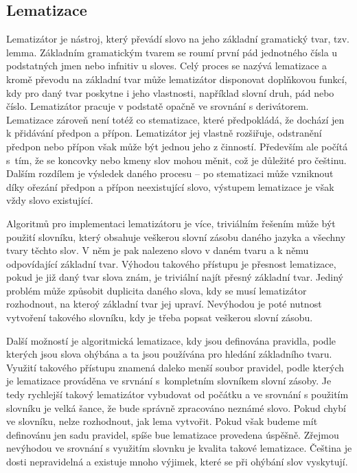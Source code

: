 \documentclass[FM,DP]{tulthesis}
\begin{document}
\subsection{Lematizace}

Lematizátor je nástroj, který převádí slovo na jeho základní gramatický tvar, tzv. lemma.
Základním gramatickým tvarem se roumí první pád jednotného čísla u podstatných jmen nebo infnitiv 
u sloves. Celý proces se nazývá lematizace a kromě převodu na základní tvar může lematizátor
disponovat doplňkovou funkcí, kdy pro daný tvar poskytne i jeho vlastnosti, například 
slovní druh, pád nebo číslo. Lematizátor pracuje v podstatě opačně ve srovnání s derivátorem. 
Lematizace zároveň není totéž co stematizace, které předpokládá, že dochází 
jen k přidávání předpon a přípon. Lematizátor jej vlastně rozšiřuje, odstranění
předpon nebo přípon však může být jednou jeho z činností. Především ale počítá s~tím, 
že se koncovky nebo kmeny slov mohou měnit, což je důležité pro češtinu.
Dalším rozdílem je výsledek daného procesu -- po stematizaci může vzniknout díky ořezání
předpon a přípon neexistující slovo, výstupem lematizace je však vždy slovo existující.

Algoritmů pro implementaci lematizátoru je více, triviálním řešením může být použití
slovníku, který obsahuje veškerou slovní zásobu daného jazyka a všechny tvary těchto
slov. V něm je pak nalezeno slovo v daném tvaru a k němu odpovídající základní tvar.
Výhodou takového přístupu je přesnost lematizace, pokud je již daný tvar slova znám, 
je triviální najít přesný základní tvar. Jediný problém může způsobit duplicita daného 
slova, kdy se musí lematizátor rozhodnout, na kteroý základní tvar jej upraví. Nevýhodou
je poté nutnost vytvoření takového slovníku, kdy je třeba popsat veškerou slovní zásobu.

Další možností je algoritmická lematizace, kdy jsou definována pravidla, podle kterých jsou
slova ohýbána a ta jsou používána pro hledání základního tvaru. Využití takového přístupu
znamená daleko menší soubor pravidel, podle kterých je lematizace prováděna ve srvnání 
s~kompletním slovníkem slovní zásoby. Je tedy rychlejší takový lematizátor vybudovat
od počátku a ve srovnání s použitím slovníku je velká šance, že bude správně zpracováno
neznámé slovo. Pokud chybí ve slovníku, nelze rozhodnout, jak lema vytvořit. Pokud
však budeme mít definovánu jen sadu pravidel, spíše bue lematizace provedena úspěšně.
Zřejmou nevýhodou ve srovnání s využitím slovnku je kvalita takové lematizace. 
Čeština je dosti nepravidelná a existuje mnoho výjimek, které se při ohýbání slov vyskytují.
\end{document}
